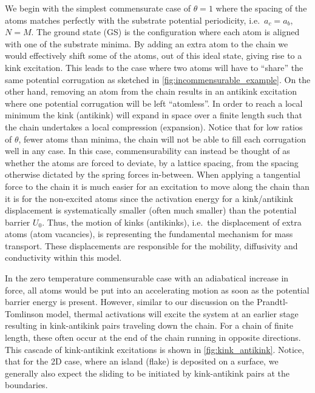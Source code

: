 We begin with the simplest commensurate case of $\theta = 1$ where the spacing
of the atoms matches perfectly with the substrate potential periodicity, i.e.\
$a_c = a_b$, $N = M$. The ground state (\acrshort{GS}) is the configuration
where each atom is aligned with one of the substrate minima. By adding an extra
atom to the chain we would effectively shift some of the atoms, out of this
ideal state, giving rise to a kink excitation. This leads to the case where two
atoms will have to ``share'' the same potential corrugation as sketched in
\cref{fig:incommensurable_example}. On the other hand, removing an atom from
the chain results in an antikink excitation where one potential corrugation will
be left ``atomless''. In order to reach a local minimum the kink (antikink) will
expand in space over a finite length such that the chain undertakes a local
compression (expansion). Notice that for low ratios of $\theta$, fewer atoms than minima, the chain will not be able to fill each corrugation well in any case. In this case, commensurability can instead be thought of as whether the atoms are forced to deviate, by a lattice spacing, from the spacing otherwise dictated by the spring forces in-between. When applying a tangential force to the chain it is much
easier for an excitation to move along the chain than it is for the non-excited
atoms since the activation energy for a kink/antikink
displacement is systematically smaller (often much smaller) than the potential
barrier $U_0$. Thus, the motion of kinks (antikinks), i.e.\ the displacement of
extra atoms (atom vacancies), is representing the fundamental mechanism for
mass transport. These displacements are responsible for the mobility,
diffusivity and conductivity within this model. 

In the zero temperature commensurable case with an adiabatical increase in force, all atoms would be put into an accelerating motion as soon as the potential barrier energy is present. However, similar to our discussion on the Prandtl-Tomlinson model, thermal activations will excite the system at an earlier stage resulting in kink-antikink pairs traveling down the chain. For a chain of finite length, these often occur at the end of the chain running in opposite directions. This cascade of kink-antikink excitations is shown in \cref{fig:kink_antikink}. Notice, that for the 2D case, where an island (flake) is deposited on a surface, we generally also expect the sliding to be initiated by kink-antikink pairs at the boundaries. 


